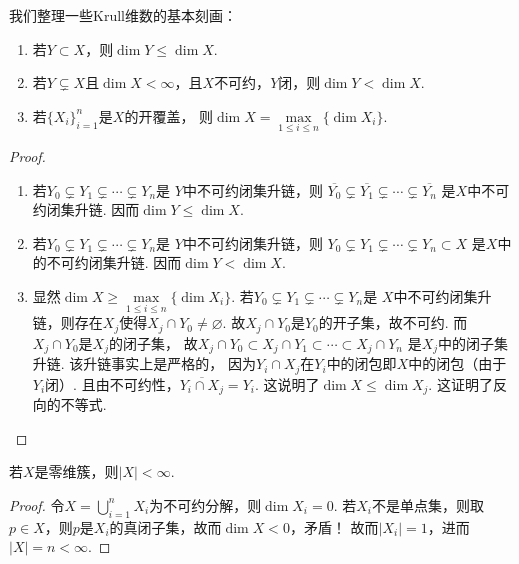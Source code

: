     \begin{proposition}
        我们整理一些Krull维数的基本刻画：
        \begin{enumerate}
            \item[(1)] 若$Y \subset X$，则$\dim Y \leq \dim X$.
            \item[(2)] 若$Y \subsetneq X$且$\dim X < \infty$，且$X$不可约，$Y$闭，则$\dim Y < \dim X$.
            \item[(3)] 若$\{X_{i}\}_{i=1}^{n}$是$X$的开覆盖，
                       则$\dim X = \max\limits_{1 \leq i \leq n}\{\dim X_{i}\}$.
        \end{enumerate}
    \end{proposition}
    \begin{proof}
        \begin{enumerate}
            \item[(1)] 若$Y_{0} \subsetneq Y_{1} \subsetneq \cdots \subsetneq Y_{n}$是
                       $Y$中不可约闭集升链，则
                       $\overline{Y_{0}} \subsetneq \overline{Y_{1}} \subsetneq \cdots \subsetneq \overline{Y_{n}}$
                       是$X$中不可约闭集升链. 因而$\dim Y \leq \dim X$.
            \item[(2)] 若$Y_{0} \subsetneq Y_{1} \subsetneq \cdots \subsetneq Y_{n}$是
                       $Y$中不可约闭集升链，则
                       $Y_{0} \subsetneq Y_{1} \subsetneq \cdots \subsetneq Y_{n} \subset X$
                       是$X$中的不可约闭集升链. 因而$\dim Y < \dim X$.
            \item[(3)] 显然$\dim X \geq \max\limits_{1 \leq i \leq n}\{\dim X_{i}\}$.
                       若$Y_{0} \subsetneq Y_{1} \subsetneq \cdots \subsetneq Y_{n}$是
                       $X$中不可约闭集升链，则存在$X_{j}$使得$X_{j} \cap Y_{0} \neq \varnothing$.
                       故$X_{j} \cap Y_{0}$是$Y_{0}$的开子集，故不可约. 
                       而$X_{j} \cap Y_{0}$是$X_{j}$的闭子集，
                       故$X_{j} \cap Y_{0} \subset X_{j} \cap Y_{1} \subset \cdots \subset X_{j} \cap Y_{n}$
                       是$X_{j}$中的闭子集升链. 该升链事实上是严格的，
                       因为$Y_{i} \cap X_{j}$在$Y_{i}$中的闭包即$X$中的闭包（由于$Y_{i}$闭）.
                       且由不可约性，$\overline{Y_{i} \cap X_{j}}=Y_{i}$. 
                       这说明了$\dim X \leq \dim X_{j}$. 这证明了反向的不等式.\qedhere
        \end{enumerate}
    \end{proof}

    \begin{proposition}
        若$X$是零维簇，则$|X| < \infty$.
    \end{proposition}
    \begin{proof}
        令$X=\bigcup_{i=1}^{n}X_{i}$为不可约分解，则$\dim X_{i}=0$. 
        若$X_{i}$不是单点集，则取$p \in X$，则$p$是$X_{i}$的真闭子集，故而$\dim X < 0$，矛盾！
        故而$|X_{i}|=1$，进而$|X|=n < \infty$.
    \end{proof}

